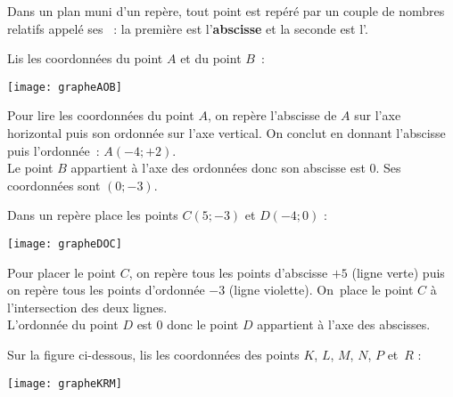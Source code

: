
\begin{methode*1}

\begin{aconnaitre}
Dans un plan muni d'un repère, tout point est repéré par un couple de nombres relatifs appelé ses  : la première est l'\textbf{abscisse} et la seconde est l'.
\end{aconnaitre}

\begin{exemple*1}
Lis les coordonnées du point $A$ et du point $B$ :
\begin{center} \texttt{[image: grapheAOB]} \end{center}

Pour lire les coordonnées du point $A$, on repère l'abscisse de $A$ sur l'axe horizontal puis  son ordonnée sur l'axe vertical. On conclut en donnant l'abscisse puis l'ordonnée : $A (- 4 ; + 2)$. \\[0.5em]
Le point $B$ appartient à l'axe des ordonnées donc son abscisse est 0. Ses coordonnées sont $(0 ; - 3)$.
\end{exemple*1}

\begin{exemple*1}
Dans un repère place les points $C(5 ; - 3)$ et $D(- 4 ; 0)$ : \\[0.5cm]
\begin{center} \texttt{[image: grapheDOC]} \end{center}
\vspace{0.5cm}
Pour placer le point $C$, on repère tous les points d'abscisse $+ 5$ (ligne verte) puis on repère tous les points d'ordonnée $- 3$ (ligne violette). On place le point $C$ à l'intersection des deux lignes. \\[0.5em]
L'ordonnée du point $D$ est 0 donc le point $D$ appartient à l'axe des abscisses.
\end{exemple*1}

\exercice %
\begin{minipage}[c]{0.45\linewidth}
Sur la figure ci-dessous, lis les coordonnées des points $K$, $L$, $M$, $N$, $P$ et $R$ :
 \end{minipage} \hfill%
 \begin{minipage}[c]{0.4\linewidth}
 \vspace{2cm}
 \begin{center} \texttt{[image: grapheKRM]} \end{center}
  \end{minipage} \\


\end{methode*1}

